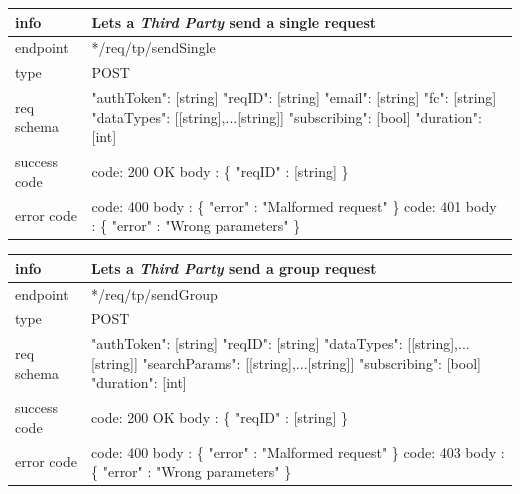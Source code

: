 \documentclass[titlepage]{article}
\begin{document}
\begin{tabularx}{\textwidth}{lX} \hline
    info & Lets a {\it Third Party} send a single request \\ \hline
    endpoint & */req/tp/sendSingle \\ \hline
    type & POST \\ \hline
    req schema & 
    "authToken": [string] \newline
    "reqID": [string] \newline
    "email": [string] \newline
    "fc": [string] \newline
    "dataTypes": [[string],...[string]] \newline
    "subscribing": [bool] \newline
    "duration": [int] \\ \hline
    success code &
        code: 200 OK \newline  
        body : \{ \newline
        "reqID" : [string] \newline
        \} \\ \hline
    error code &
        code: 400 \newline
        body : \{ "error" : "Malformed request" \} \newline \newline
        code: 401 \newline
        body : \{ "error" : "Wrong parameters" \}\\ \hline
\end{tabularx}
		
\vspace{\baselineskip}

\begin{tabularx}{\textwidth}{lX} \hline
    info & Lets a {\it Third Party} send a group request \\ \hline
    endpoint & */req/tp/sendGroup \\ \hline
    type & POST \\ \hline
    req schema &
    "authToken": [string] \newline
    "reqID": [string] \newline
    "dataTypes": [[string],...[string]] \newline
    "searchParams": [[string],...[string]] \newline
    "subscribing": [bool] \newline
    "duration": [int] \\ \hline
    success code &
        code: 200 OK \newline  
        body : \{ \newline
        "reqID" : [string] \newline
        \} \\ \hline
    error code &
        code: 400 \newline
        body : \{ "error" : "Malformed request" \} \newline \newline
        code: 403 \newline
        body : \{ "error" : "Wrong parameters" \}\\ \hline
\end{tabularx}
		
\end{document}
